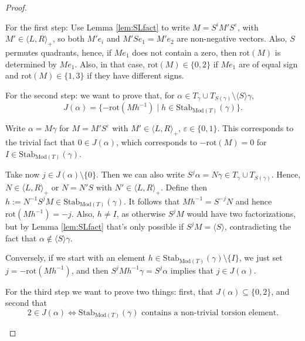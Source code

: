 \documentclass{article}
\begin{document}
\begin{proof}
\begin{enumerate}
            For the first step: Use Lemma \ref{lem:SLfact} to write $M=S^i M' S^\varepsilon$, with $M'\in\langle L, R\rangle_+$, so both $M'e_i$ and $M'S e_1=M'e_2$ are non-negative vectors. Also, $S$ permutes quadrants, hence, if $Me_1$ does not contain a zero, then $\mathrm{rot}(M)$ is determined by $Me_1$. 
            Also, in that case, $\mathrm{rot}(M)\in\{0,2\}$ if $Me_1$ are of equal sign and $\mathrm{rot}(M)\in\{1,3\}$ if they have different signs.

            For the second step: we want to prove that, for $\alpha\in T_\gamma\cup T_{S(\gamma)}\setminus \langle S\rangle \gamma$, 
            \[
            J(\alpha)=\{-\mathrm{rot}(Mh^{-1})\mid h\in\mathrm{Stab}_{\mathrm{Mod}(T)}(\gamma)\}.
            \]

            Write $\alpha=M\gamma$ for $M=M'S^\varepsilon$ with $M'\in\langle L,R\rangle_+$, $\varepsilon\in\{0,1\}$. This corresponds to the trivial fact that $0\in J(\alpha)$, which corresponds to $-\mathrm{rot}(M)=0$ for $I\in\mathrm{Stab}_{\mathrm{Mod}(T)}(\gamma)$. 
            
            Take now $j\in J(\alpha)\setminus\{0\}$. Then we can also write $S^j\alpha=N\gamma\in T_\gamma\cup T_{S(\gamma)}$. Hence, $N\in\langle L,R\rangle_+$ or $N=N'S$ with $N'\in\langle L,R\rangle_+$. Define then $h:=N^{-1}S^jM\in \mathrm{Stab}_{\mathrm{Mod}(T)}(\gamma)$. It follows that $Mh^{-1}=S^{-j}N$ and hence $\mathrm{rot}(Mh^{-1})=-j$. Also, $h\neq I$, as otherwise $S^jM$ would have two factorizations, but by Lemma \ref{lem:SLfact} that's only possible if $S^jM=\langle S\rangle$, contradicting the fact that $\alpha\notin \langle S\rangle \gamma$.

            Conversely, if we start with an element $h\in\mathrm{Stab}_{\mathrm{Mod}(T)}(\gamma)\setminus\{I\}$, we just set $j=-\mathrm{rot}(Mh^{-1})$, and then $S^jMh^{-1}\gamma=S^j\alpha$ implies that $j\in J(\alpha)$.

            For the third step we want to prove two things: first, that $J(\alpha)\subseteq \{0,2\}$, and second that 
            \[2\in J(\alpha)\iff \mathrm{Stab}_{\mathrm{Mod}(T)}(\gamma) \text{ contains a non-trivial torsion element.}\]


\end{enumerate}
\end{proof}
\end{document}
